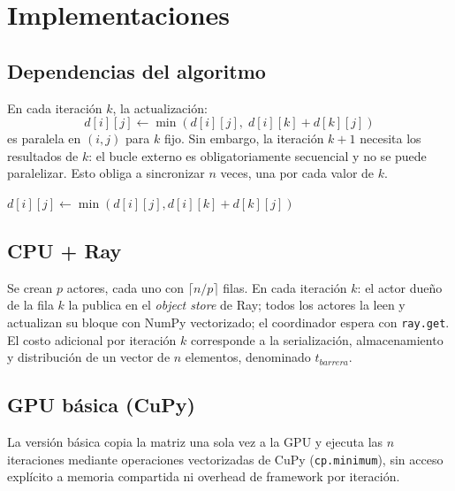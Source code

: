 \documentclass[conference]{IEEEtran}
\begin{document}
\section{Implementaciones}
\label{sec:solucion}

\subsection{Dependencias del algoritmo}

En cada iteración $k$, la actualización:
\begin{equation}
  d[i][j] \leftarrow \min(d[i][j],\; d[i][k] + d[k][j])
\end{equation}
es paralela en $(i,j)$ para $k$ fijo. Sin embargo, la iteración $k+1$
necesita los resultados de $k$: el bucle externo es obligatoriamente
secuencial y no se puede paralelizar. Esto obliga a sincronizar $n$
veces, una por cada valor de $k$.

\begin{algorithm}
\caption{Floyd-Warshall}
\label{alg:fw}
\begin{algorithmic}
      \STATE $d[i][j] \leftarrow \min(d[i][j], d[i][k] + d[k][j])$
    \ENDFOR
  \ENDFOR
\ENDFOR
\end{algorithmic}
\end{algorithm}

\subsection{CPU + Ray}

Se crean $p$ actores, cada uno con $\lceil n/p \rceil$ filas. En cada
iteración $k$: el actor dueño de la fila $k$ la publica en el
\textit{object store} de Ray; todos los actores la leen y actualizan
su bloque con NumPy vectorizado; el coordinador espera con
\texttt{ray.get}. El costo adicional por iteración $k$ corresponde a
la serialización, almacenamiento y distribución de un vector de $n$
elementos, denominado $t_{barrera}$.

\subsection{GPU básica (CuPy)}

La versión básica copia la matriz una sola vez a la GPU y ejecuta las
$n$ iteraciones mediante operaciones vectorizadas de CuPy
(\texttt{cp.minimum}), sin acceso explícito a memoria compartida ni
overhead de framework por iteración.
\end{document}
